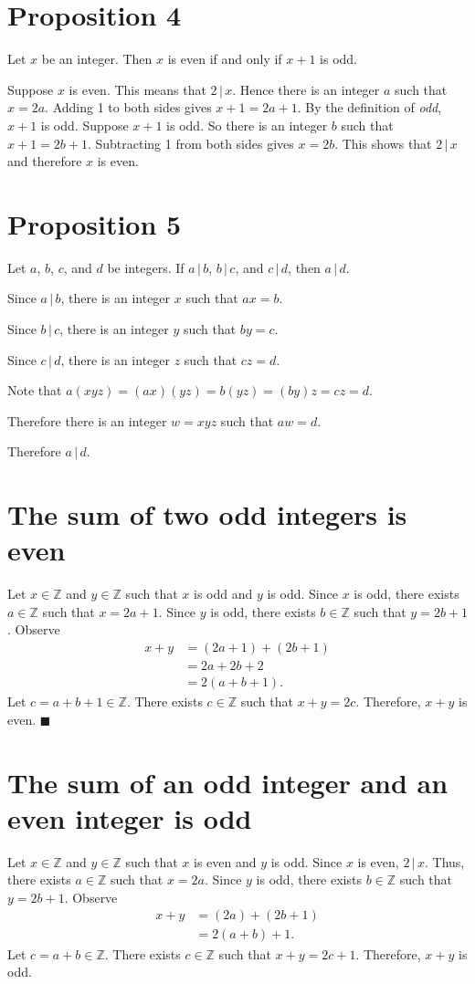 \documentclass[12pt]{article}
\begin{document}
\section*{Proposition 4}
Let $x$ be an integer. Then $x$ is even if and only if $x+1$ is odd.

Suppose $x$ is even. This means that $2\,|\,x$. Hence there is an integer $a$ such that $x=2a$. Adding 1 to both sides gives $x+1=2a+1$. By the definition of \textit{odd}, $x+1$ is odd.
Suppose $x+1$ is odd. So there is an integer $b$ such that $x+1=2b+1$. Subtracting 1 from both sides gives $x=2b$. This shows that $2\,|\,x$ and therefore $x$ is even.
\section*{Proposition 5}
Let $a$, $b$, $c$, and $d$ be integers. If $a\,|\,b$, $b\,|\,c$, and $c\,|\,d$, then $a\,|\,d$.

Since $a\,|\,b$, there is an integer $x$ such that $ax=b$.

Since $b\,|\,c$, there is an integer $y$ such that $by=c$.

Since $c\,|\,d$, there is an integer $z$ such that $cz=d$.

Note that $a(xyz)=(ax)(yz)=b(yz)=(by)z=cz=d$.

Therefore there is an integer $w=xyz$ such that $aw=d$.

Therefore $a\,|\,d$.
\section{The sum of two odd integers is even}
Let $x\in\mathbb{Z}$ and $y\in\mathbb{Z}$ such that $x$ is odd and $y$ is odd. Since $x$ is odd, there exists $a\in\mathbb{Z}$ such that $x=2a+1$. Since $y$ is odd, there exists $b\in\mathbb{Z}$ such that $y=2b+1$. Observe
\begin{align*}
x+y
&=(2a+1)+(2b+1)\\
&=2a+2b+2\\
&=2(a+b+1).
\end{align*}
Let $c=a+b+1\in\mathbb{Z}$. There exists $c\in\mathbb{Z}$ such that $x+y=2c$. Therefore, $x+y$ is even. $\blacksquare$
\section{The sum of an odd integer and an even integer is odd}
Let $x\in\mathbb{Z}$ and $y\in\mathbb{Z}$ such that $x$ is even and $y$ is odd. Since $x$ is even, $2\,|\,x$. Thus, there exists $a\in\mathbb{Z}$ such that $x=2a$. Since $y$ is odd, there exists $b\in\mathbb{Z}$ such that $y=2b+1$. Observe
\begin{align*}
x+y
&=(2a)+(2b+1)\\
&=2(a+b)+1.
\end{align*}
Let $c=a+b\in\mathbb{Z}$. There exists $c\in\mathbb{Z}$ such that $x+y=2c+1$. Therefore, $x+y$ is odd.
\end{document}
